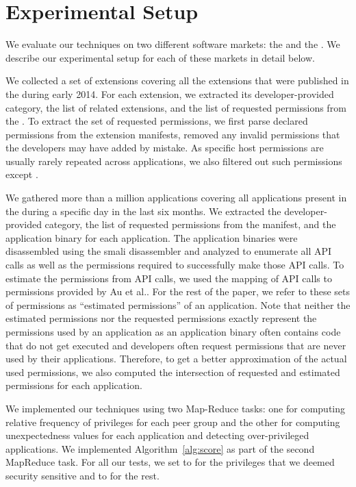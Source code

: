 \section{Experimental Setup}
\label{setup}
We evaluate our techniques on two different software markets: the \ChromeMarket{}
and the \AndroidMarket{}. We describe our experimental  setup for each of 
these markets in detail below.  

We collected a set of  \Chrome{} extensions covering all the extensions that were published in the \ChromeMarket{} during early 2014. For each extension, we extracted
its developer-provided category, the list of related extensions, and the list of requested 
permissions from the \ChromeMarket{}. To extract the set of requested permissions, 
we first parse declared permissions from the extension manifests, removed any 
invalid permissions that the developers may have added by mistake. As specific host 
permissions are usually rarely repeated across applications, we also filtered out such 
permissions except . 



We gathered more than a million \Android{} applications covering all applications present in the \AndroidMarket{} during a specific day in the last six months. We extracted  the developer-provided category, the list of requested permissions 
from the manifest, and the application binary for each application. The application binaries were disassembled 
using the smali disassembler and analyzed to enumerate all API calls as well as the permissions required 
to successfully make those API calls. To estimate the permissions from API calls, we used the mapping of 
API calls to permissions provided by Au et al.\cite{au2012pscout}. For the rest of the paper, we refer to 
these sets of permissions as ``estimated permissions'' of an application. Note that neither the estimated 
permissions nor the requested permissions exactly represent the permissions used by an 
application as an application binary often contains code that do not get executed and developers 
often request permissions that are never used by their applications. Therefore, to get a better approximation 
of the actual used permissions, we also computed the intersection of requested and estimated permissions
for each application.

 We implemented our techniques using two Map-Reduce tasks: one for computing 
relative frequency of privileges for each peer group and the other for computing unexpectedness values for 
each application and detecting over-privileged applications. We implemented Algorithm~\ref{alg:score} as part of 
the second MapReduce task. For all our tests, we set  to  for the privileges that we deemed security 
sensitive and to  for the rest.  



